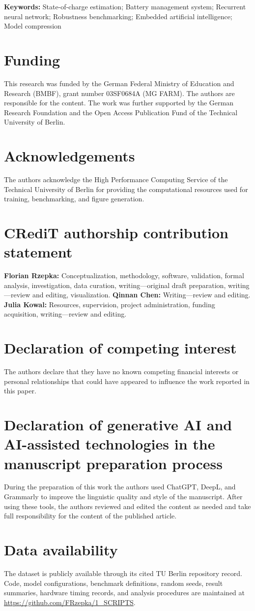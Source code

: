 \documentclass[11pt,a4paper]{article}
\begin{document}
\textbf{Keywords:} State-of-charge estimation; Battery management system; Recurrent neural network; Robustness benchmarking; Embedded artificial intelligence; Model compression

\section*{Funding}
This research was funded by the German Federal Ministry of Education and Research (BMBF), grant number 03SF0684A (MG FARM). The authors are responsible for the content. The work was further supported by the German Research Foundation and the Open Access Publication Fund of the Technical University of Berlin.

\section*{Acknowledgements}
The authors acknowledge the High Performance Computing Service of the Technical University of Berlin for providing the computational resources used for training, benchmarking, and figure generation.

\section*{CRediT authorship contribution statement}
\textbf{Florian Rzepka:} Conceptualization, methodology, software, validation, formal analysis, investigation, data curation, writing---original draft preparation, writing---review and editing, visualization. \textbf{Qinnan Chen:} Writing---review and editing. \textbf{Julia Kowal:} Resources, supervision, project administration, funding acquisition, writing---review and editing.

\section*{Declaration of competing interest}
The authors declare that they have no known competing financial interests or personal relationships that could have appeared to influence the work reported in this paper.

\section*{Declaration of generative AI and AI-assisted technologies in the manuscript preparation process}
During the preparation of this work the authors used ChatGPT, DeepL, and Grammarly to improve the linguistic quality and style of the manuscript. After using these tools, the authors reviewed and edited the content as needed and take full responsibility for the content of the published article.

\section*{Data availability}
The dataset is publicly available through its cited TU Berlin repository record. Code, model configurations, benchmark definitions, random seeds, result summaries, hardware timing records, and analysis procedures are maintained at \url{https://github.com/FRzepka/1_SCRIPTS}.
\end{document}
